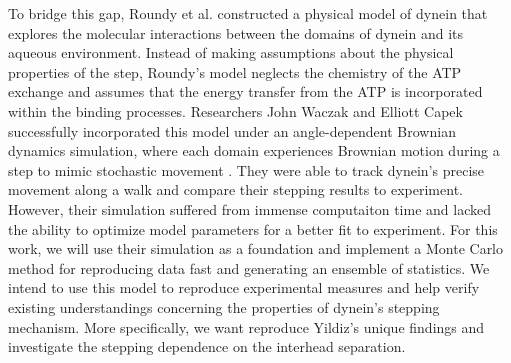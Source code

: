 To bridge this gap, Roundy et al. constructed a physical model of dynein that explores the molecular interactions between the domains of dynein and its aqueous environment. Instead of making assumptions about the physical properties of the step, Roundy's model neglects the chemistry of the ATP exchange and assumes that the energy transfer from the ATP is incorporated within the binding processes. Researchers John Waczak and Elliott Capek successfully incorporated this model under an angle-dependent Brownian dynamics simulation, where each domain experiences Brownian motion during a step to mimic stochastic movement \cite{Capek2017, }. They were able to track dynein's precise movement along a walk and compare their stepping results to experiment. However, their simulation suffered from immense computaiton time and lacked the ability to optimize model parameters for a better fit to experiment. For this work, we will use their simulation as a foundation and implement a Monte Carlo method for reproducing data fast and generating an ensemble of statistics. We intend to use this model to reproduce experimental measures and help verify existing understandings concerning the properties of dynein’s stepping mechanism. More specifically, we want reproduce Yildiz's unique findings and investigate the stepping dependence on the interhead separation. 




